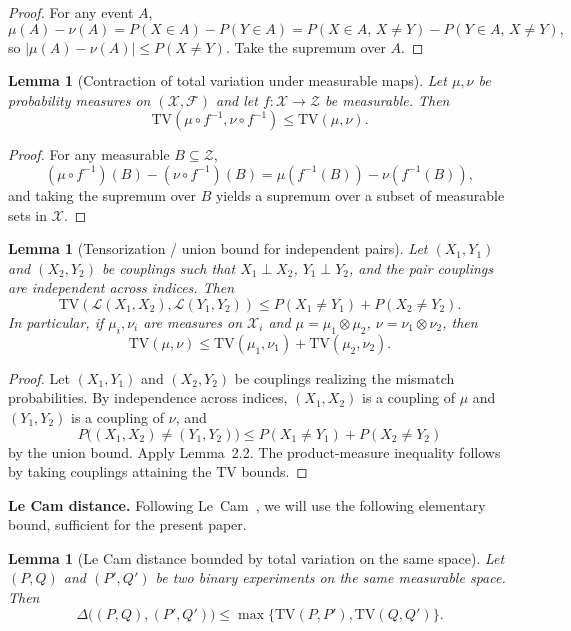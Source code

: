 \documentclass{article}
\newtheorem{lemma}[theorem]{Lemma}
\begin{document}
\begin{proof}
For any event $A$,
\[
\mu(A) - \nu(A) = P(X \in A) - P(Y \in A) = P(X \in A,\, X \neq Y) - P(Y \in A,\, X \neq Y),
\]
so $|\mu(A) - \nu(A)| \leq P(X \neq Y)$. Take the supremum over $A$.
\end{proof}

\begin{lemma}[Contraction of total variation under measurable maps]
\label{lem:tv-contraction}
Let $\mu, \nu$ be probability measures on $(\mathcal{X}, \mathcal{F})$ and let $f: \mathcal{X} \to \mathcal{Z}$ be measurable. Then
\[
\mathrm{TV}(\mu \circ f^{-1}, \nu \circ f^{-1}) \leq \mathrm{TV}(\mu, \nu).
\]
\end{lemma}

\begin{proof}
For any measurable $B \subseteq \mathcal{Z}$,
\[
(\mu \circ f^{-1})(B) - (\nu \circ f^{-1})(B) = \mu(f^{-1}(B)) - \nu(f^{-1}(B)),
\]
and taking the supremum over $B$ yields a supremum over a subset of measurable sets in $\mathcal{X}$.
\end{proof}

\begin{lemma}[Tensorization / union bound for independent pairs]
\label{lem:tv-tensorization}
Let $(X_1, Y_1)$ and $(X_2, Y_2)$ be couplings such that $X_1 \perp X_2$, $Y_1 \perp Y_2$, and the pair couplings
are independent across indices. Then
\[
\mathrm{TV}(\mathcal{L}(X_1, X_2), \mathcal{L}(Y_1, Y_2)) \leq P(X_1 \neq Y_1) + P(X_2 \neq Y_2).
\]
In particular, if $\mu_i, \nu_i$ are measures on $\mathcal{X}_i$ and $\mu = \mu_1 \otimes \mu_2$, $\nu = \nu_1 \otimes \nu_2$, then
\[
\mathrm{TV}(\mu, \nu) \leq \mathrm{TV}(\mu_1, \nu_1) + \mathrm{TV}(\mu_2, \nu_2).
\]
\end{lemma}

\begin{proof}
Let $(X_1, Y_1)$ and $(X_2, Y_2)$ be couplings realizing the mismatch probabilities. By independence
across indices, $(X_1, X_2)$ is a coupling of $\mu$ and $(Y_1, Y_2)$ is a coupling of $\nu$, and
\[
P\bigl((X_1, X_2) \neq (Y_1, Y_2)\bigr) \leq P(X_1 \neq Y_1) + P(X_2 \neq Y_2)
\]
by the union bound. Apply Lemma~2.2. The product-measure inequality follows by taking couplings
attaining the TV bounds.
\end{proof}

\textbf{Le Cam distance.} Following Le~Cam~\cite{LeC86}, we will use the following elementary bound, sufficient for the present paper.

\begin{lemma}[Le Cam distance bounded by total variation on the same space]
\label{lem:lecam-tv-bound}
Let $(P, Q)$ and $(P', Q')$ be two binary experiments on the same measurable space. Then
\[
\Delta\bigl((P, Q), (P', Q')\bigr) \leq \max\{\mathrm{TV}(P, P'), \mathrm{TV}(Q, Q')\}.
\]
\end{lemma}
\end{document}
